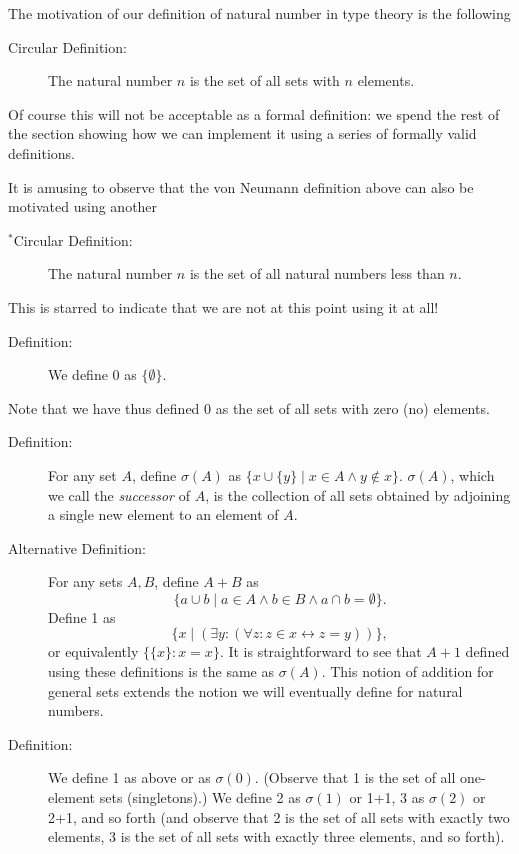 \documentclass[12pt]{book}
\begin{document}
The motivation of our definition of natural number in type theory is
the following

\begin{description}

\item[Circular Definition:] The natural number $n$ is the set of all
sets with $n$ elements.

\end{description}

Of course this will not be acceptable as a formal definition:  we spend the rest of the section showing how we can implement it using a series of formally valid definitions.

It is amusing to observe that the von Neumann definition above can
also be motivated using another

\begin{description}

\item[$^*$Circular Definition:] The natural number $n$ is the set of
all natural numbers less than $n$.

\end{description}

This is starred to indicate that we are not at this point using it at all!


\begin{description}
\item[Definition:]  We define 0 as $\{\emptyset\}$.  

\end{description}

Note that we have thus defined 0 as the set
of all sets with zero (no) elements.

\begin{description}

\item [Definition:] For any set $A$, define $\sigma(A)$ as $\{x \cup \{y\} \mid x \in A \wedge y
\not\in x\}$.  $\sigma(A)$, which we call the {\em successor\/} of $A$, is the collection of all sets obtained by
adjoining a single new element to an element of $A$. 

\item[Alternative Definition:]  For any sets $A,B$, define $A+B$ as $$\{a \cup b\mid a \in A \wedge b \in B \wedge a \cap b = \emptyset\}.$$  Define 1 as $$\{x\mid (\exists y:(\forall z:z \in x \leftrightarrow z=y))\},$$ or equivalently $\{\{x\}:x=x\}$.  It is straightforward to see that $A+1$ defined using these definitions is the same as $\sigma(A)$.  This notion of addition for general sets extends the notion we will eventually define for natural numbers.

\item[Definition:] We define 1 as above or as $\sigma(0)$.  (Observe that 1 is the set
of all one-element sets (singletons).)  We define 2 as $\sigma(1)$ or 1+1, 3 as $\sigma(2)$ or 2+1,
and so forth (and observe that 2 is the set of all sets with exactly
two elements, 3 is the set of all sets with exactly three elements,
and so forth).

\end{description}
\end{document}
